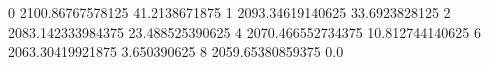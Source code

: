 0 2100.86767578125 41.2138671875
1 2093.34619140625 33.6923828125
2 2083.142333984375 23.488525390625
4 2070.466552734375 10.812744140625
6 2063.30419921875 3.650390625
8 2059.65380859375 0.0
